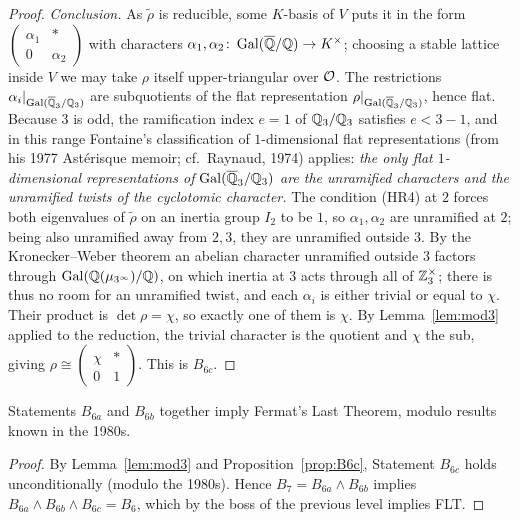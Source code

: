 \documentclass[11pt]{article}
\begin{document}
\begin{proof}
\emph{Conclusion.} As $\tilde\rho$ is reducible, some $K$-basis of $V$ puts it
in the form $\left(\begin{smallmatrix}\alpha_1&*\\0&\alpha_2\end{smallmatrix}\right)$
with characters $\alpha_1,\alpha_2\colon\operatorname{Gal}(\overline{\mathbb{Q}}/\mathbb{Q})\to K^\times$; choosing a stable
lattice inside $V$ we may take $\rho$ itself upper-triangular over $\mathcal{O}$. The
restrictions $\alpha_i|_{\operatorname{Gal}(\overline{\mathbb{Q}}_3/\mathbb{Q}_3)}$ are subquotients of the flat
representation $\rho|_{\operatorname{Gal}(\overline{\mathbb{Q}}_3/\mathbb{Q}_3)}$, hence flat. Because $3$ is odd, the
ramification index $e=1$ of $\mathbb{Q}_3/\mathbb{Q}_3$ satisfies $e<3-1$, and in this range
Fontaine's classification of $1$-dimensional flat representations (from his
1977 Ast\'erisque memoir; cf.\ Raynaud, 1974) applies: \emph{the only flat
$1$-dimensional representations of $\operatorname{Gal}(\overline{\mathbb{Q}}_3/\mathbb{Q}_3)$ are the unramified
characters and the unramified twists of the cyclotomic character.} The
condition (HR4) at $2$ forces both eigenvalues of $\tilde\rho$ on an inertia
group $I_2$ to be $1$, so $\alpha_1,\alpha_2$ are unramified at $2$; being also
unramified away from $2,3$, they are unramified outside $3$. By the
Kronecker--Weber theorem an abelian character unramified outside $3$ factors
through $\operatorname{Gal}(\mathbb{Q}(\mu_{3^\infty})/\mathbb{Q})$, on which inertia at $3$ acts through all
of $\mathbb{Z}_3^\times$; there is thus no room for an unramified twist, and each
$\alpha_i$ is either trivial or equal to $\chi$. Their product is
$\det\rho=\chi$, so exactly one of them is $\chi$. By Lemma~\ref{lem:mod3}
applied to the reduction, the trivial character is the quotient and $\chi$ the
sub, giving $\rho\cong\left(\begin{smallmatrix}\chi&*\\0&1\end{smallmatrix}\right)$.
This is $B_{6c}$.
\end{proof}

\begin{theorem}\label{thm:boss7}
Statements $B_{6a}$ and $B_{6b}$ together imply Fermat's Last Theorem, modulo
results known in the 1980s.
\end{theorem}

\begin{proof}
By Lemma~\ref{lem:mod3} and Proposition~\ref{prop:B6c}, Statement $B_{6c}$
holds unconditionally (modulo the 1980s). Hence $B_7=B_{6a}\wedge B_{6b}$
implies $B_{6a}\wedge B_{6b}\wedge B_{6c}=B_6$, which by the boss of the
previous level implies FLT.
\end{proof}
\end{document}
